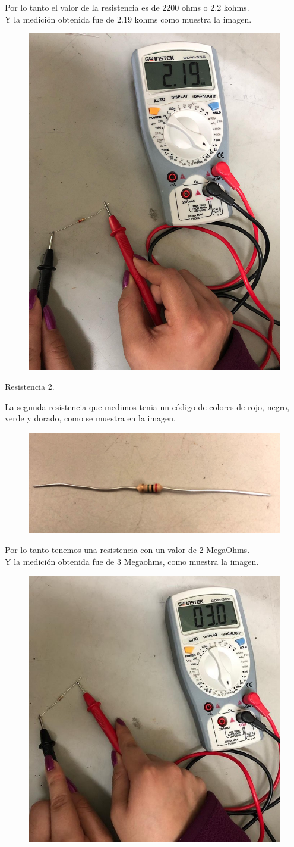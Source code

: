 \begin{flushleft}
	Por lo tanto el valor de la resistencia es de 2200 ohms o 2.2 kohms.\\
	Y la medici\'on obtenida fue de 2.19 kohms como muestra la imagen.
\begin{figure}[H]
	\centering
	\includegraphics[width=0.3\linewidth]{medicion1}
	\label{fig:medicion1}
\end{figure}
	\clearpage

	\begin{large}
		\vspace*{2cm}
		Resistencia 2.\\
	\end{large}
	La segunda resistencia que medimos tenia un c\'odigo de colores de rojo, negro, verde y dorado, como se muestra en la imagen.\\
	
\begin{figure}[H]
	\centering
	\includegraphics[width=0.4\linewidth]{resistencia2}
	\label{fig:resistencia2}
\end{figure}
 	Por lo tanto tenemos una resistencia con un valor de 2 MegaOhms.\\
 	Y la medici\'on obtenida fue de 3 Megaohms, como muestra la imagen.\\
 	\begin{figure}[H]
 		\centering
 		\includegraphics[width=0.3\linewidth]{medicion2}
 		\label{fig:medicion2}
 	\end{figure}
 	

\end{flushleft}
